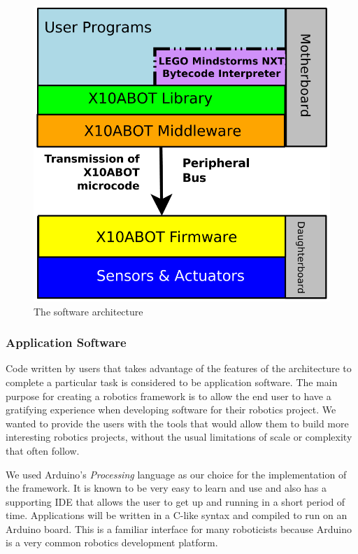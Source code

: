 	\begin{figure}[h]
	  \begin{center}
	    \includegraphics[width=0.7\columnwidth]{Figures/system.pdf}
	    \caption{The \xten software architecture}
	  \end{center}
	\end{figure}
	
	


	\subsubsection{Application Software} %
	\label{ssub:application_software}
	Code written by users that takes advantage of the features of the \xten architecture to complete a particular task is considered to be application software. The main purpose for creating a robotics framework is to allow the end user to have a gratifying experience when developing software for their robotics project. We wanted to provide the users with the tools that would allow them to build more interesting robotics projects, without the usual limitations of scale or complexity that often follow. 
	
	We used Arduino's \emph{Processing} language as our choice for the implementation of the framework. It is known to be very easy to learn and use and also has a supporting IDE that allows the user to get up and running in a short period of time. 
	Applications will be written in a C-like syntax and compiled to run on an Arduino board. This is a familiar interface for many roboticists because Arduino is a very common robotics development platform.
	
